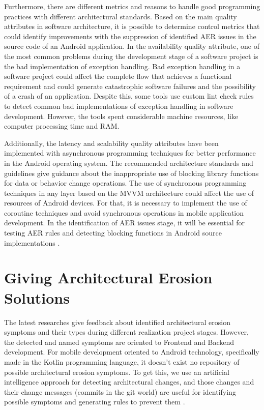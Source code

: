 Furthermore, there are different metrics and reasons to handle good programming practices with different architectural standards. Based on the main quality attributes in software architecture, it is possible to determine control metrics that could identify improvements with the suppression of identified AER issues in the source code of an Android application.
In the availability quality attribute, one of the most common problems during the development stage of a software project is the bad implementation of exception handling. Bad exception handling in a software project could affect the complete flow that achieves a functional requirement and could generate catastrophic software failures and the possibility of a crash of an application. Despite this, some tools use custom lint check rules to detect common bad implementations of exception handling in software development. However, the tools spent considerable machine resources, like computer processing time and RAM. \citet{handle-exceptions-reference}

Additionally, the latency and scalability quality attributes have been implemented with asynchronous programming techniques for better performance in the Android operating system. The recommended architecture standards and guidelines give guidance about the inappropriate use of blocking library functions for data or behavior change operations. The use of synchronous programming techniques in any layer based on the MVVM architecture could affect the use of resources of Android devices. For that, it is necessary to implement the use of coroutine techniques and avoid synchronous operations in mobile application development. In the identification of AER issues stage, it will be essential for testing AER rules and detecting blocking functions in Android source implementations \citet{performance-coroutines-reference}.


\section{Giving Architectural Erosion Solutions}
The latest researches give feedback about identified architectural erosion symptoms and their types during different realization project stages. However, the detected and named symptoms are oriented to Frontend and Backend development. For mobile development oriented to Android technology, specifically made in the Kotlin programming language, it doesn't exist no repository of possible architectural erosion symptoms. To get this, we use an artificial intelligence approach for detecting architectural changes, and those changes and their change messages (commits in the git world) are useful for identifying possible symptoms and generating rules to prevent them \citet{aer-metrics-paper}.


